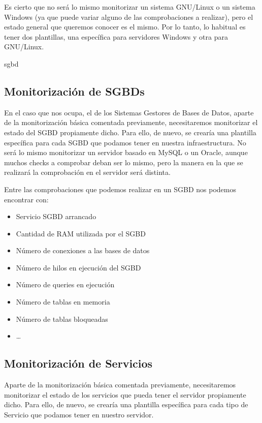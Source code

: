 Es cierto que no será lo mismo monitorizar un sistema GNU/Linux o un sistema Windows (ya que puede variar alguno de las comprobaciones a realizar), pero el estado general que queremos conocer es el mismo. Por lo tanto, lo habitual es tener dos plantillas, una específica para servidores Windows y otra para GNU/Linux.

\def\test{sgbd}
\ifx\test\@minititle
\subsection{Monitorización de SGBDs}
En el caso que nos ocupa, el de los Sistemas Gestores de Bases de Datos, aparte de la monitorización básica comentada previamente, necesitaremos monitorizar el estado del SGBD propiamente dicho. Para ello, de nuevo, se crearía una plantilla específica para cada SGBD que podamos tener en nuestra infraestructura. No será lo mismo monitorizar un servidor basado en MySQL o un Oracle, aunque muchos checks a comprobar deban ser lo mismo, pero la manera en la que se realizará la comprobación en el servidor será distinta.

Entre las comprobaciones que podemos realizar en un SGBD nos podemos encontrar con:
\begin{itemize}
    \item Servicio SGBD arrancado
    \item Cantidad de RAM utilizada por el SGBD
    \item Número de conexiones a las bases de datos
    \item Número de hilos en ejecución del SGBD
    \item Número de queries en ejecución
    \item Número de tablas en memoria
    \item Número de tablas bloqueadas
    \item …

\end{itemize}

\else
\subsection{Monitorización de Servicios}
Aparte de la monitorización básica comentada previamente, necesitaremos monitorizar el estado de los servicios que pueda tener el servidor propiamente dicho. Para ello, de nuevo, se crearía una plantilla específica para cada tipo de Servicio que podamos tener en nuestro servidor.

